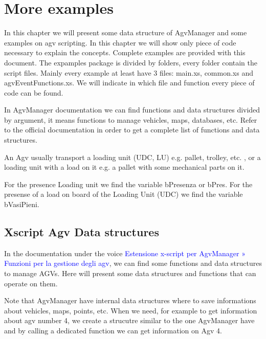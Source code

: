 

\chapter{More examples}
In this chapter we will present some data structure of AgvManager and some examples on agv scripting. In this chapter we will show only piece of code necessary to explain the concepts. Complete examples are provided with this document. The expamples package is divided by folders, every folder contain the script files. Mainly every example at least have 3 files: main.xs, common.xs and agvEventFunctions.xs. We will indicate in which file and function every piece of code can be found.

In AgvManager documentation we can find functions and data structures divided by argument, it means functions to manage vehicles, maps, databases, etc. Refer to the official documentation in order to get a complete list of functions and data structures.

An Agv usually transport a loading unit (UDC, LU) e.g. pallet, trolley, etc. , or a loading unit with a load on it e.g. a pallet with some mechanical parts on it.

For the presence Loading unit we find the variable bPresenza or bPres.
For the presense of a load on board of the Loading Unit (UDC) we find the variable bVasiPieni.

\section{Xscript Agv Data structures}
In the documentation under the voice \textcolor{blue}{Estensione x-script per AgvManager » Funzioni per la gestione degli agv}, we can find some functions and data structures to manage AGVs. Here will present some data structures and functions that can operate on them.

Note that AgvManager have internal data structures where to save informations about vehicles, maps, points, etc. When we need, for example to get information about agv number 4, we create a strucutre similar to the one AgvManager have and by calling a dedicated function we can get information on Agv 4.

